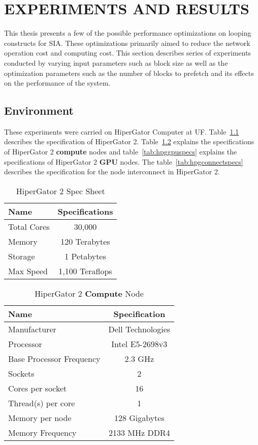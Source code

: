 \chapter{EXPERIMENTS AND RESULTS}\label{results}

This thesis presents a few of the possible performance optimizations on looping
constructs for SIA. These optimizations primarily aimed to reduce the network
operation cost and computing cost. This section describes series of experiments
conducted by varying input parameters such as block size as well as the optimization
parameters such as the number of blocks to prefetch and its effects on the performance
of the system.

\section{Environment}
These experiments were carried on HiperGator Computer at UF. Table~\ref{tab:hpg2spec}
describes the specification of HiperGator 2. Table~\ref{tab:hpgcomputespecs}
explains the specifications of HiperGator 2 \textbf{compute} nodes and
table~\ref{tab:hpggpuspecs} explains the specifications of HiperGator 2 \textbf{GPU}
nodes. The table~\ref{tab:hpgconnectspecs} describes the specification for the
node interconnect in HiperGator 2.

\begin{table}[h]
  \centering
  \begin{tabular}{l | c}
    \hline
    Name        & Specifications  \\
    \hline
    Total Cores & 30,000          \\
    Memory      & 120 Terabytes   \\
    Storage     & 1 Petabytes     \\
    Max Speed   & 1,100 Teraflops \\
    \hline
  \end{tabular}
  \caption{HiperGator 2 Spec Sheet}
  \label{tab:hpg2spec}
\end{table}

\begin{table}[h]
  \centering
  \begin{tabular}{l | c}
    \hline
    Name                       & Specification     \\
    \hline
    Manufacturer               & Dell Technologies \\
    Processor                  & Intel E5-2698v3   \\
    Base Processor Frequency   & 2.3 GHz           \\
    Sockets                    & 2                 \\
    Cores per socket           & 16                \\
    Thread(s) per core         & 1                 \\
    Memory per node            & 128 Gigabytes     \\
    Memory Frequency           & 2133 MHz DDR4     \\
    \hline
  \end{tabular}
  \caption{HiperGator 2 \textbf{Compute} Node}
  \label{tab:hpgcomputespecs}
\end{table}


